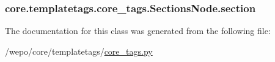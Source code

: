 \hypertarget{classcore_1_1templatetags_1_1core__tags_1_1SectionsNode_a03036dd42e3c41e6e861188adb81ea57}{
\subsubsection[{section}]{\setlength{\rightskip}{0pt plus 5cm}core.\-templatetags.\-core\-\_\-tags.\-Sections\-Node.\-section}}\label{classcore_1_1templatetags_1_1core__tags_1_1SectionsNode_a03036dd42e3c41e6e861188adb81ea57}


The documentation for this class was generated from the following file\-:\begin{DoxyCompactItemize}
\item 
/wepo/core/templatetags/\hyperlink{core__tags_8py}{core\-\_\-tags.\-py}\end{DoxyCompactItemize}
